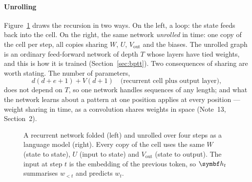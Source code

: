 \documentclass[11pt]{article}
\newcommand{\hv}{\vect{h}}
\newcommand{\yv}{\vect{y}}
\newcommand{\ev}{\vect{e}}
\newcommand{\bos}{\texttt{<bos>}}
\begin{document}
\paragraph{Unrolling} Figure~\ref{fig:unrolled} draws the recursion in two ways. On the left, a loop: the state feeds back
into the cell. On the right, the same network \emph{unrolled} in time: one copy of the cell per step, all copies sharing
$W$, $U$, $V_{\mathrm{out}}$ and the biases. The unrolled graph is an ordinary feed-forward network of depth $T$ whose
layers have tied weights, and this is how it is trained (Section~\ref{sec:bptt}). Two consequences of sharing are worth
stating. The number of parameters,
\begin{equation}\label{eq:rnnparams}
  d(d + e + 1) + V(d + 1) \quad\text{(recurrent cell plus output layer)},
\end{equation}
does not depend on $T$, so one network handles sequences of any length; and what the network learns about a pattern at
one position applies at every position --- weight sharing in time, as a convolution shares weights in space
(Note~13, Section~2).

\begin{figure}[htbp]
\centering
{}
\caption{A recurrent network folded (left) and unrolled over four steps as a language model (right). Every copy of the
cell uses the same $W$ (state to state), $U$ (input to state) and $V_{\mathrm{out}}$ (state to output). The input at
step $t$ is the embedding of the previous token, so $\hv_t$ summarises $w_{<t}$ and predicts $w_t$.}
\label{fig:unrolled}
\end{figure}
\end{document}
